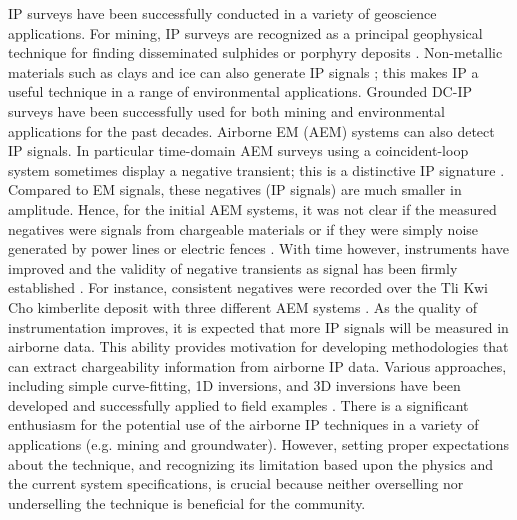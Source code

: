 \documentclass[manuscript]{geophysics}
\begin{document}
IP surveys have been successfully conducted in a variety of geoscience applications. For mining, IP surveys are recognized as a principal geophysical technique for finding disseminated sulphides or porphyry deposits \cite[]{fink1990}. Non-metallic materials such as clays and ice can also generate IP signals \cite[]{grimm2015,leroy2009}; this makes IP a useful technique in a range of environmental applications. Grounded DC-IP surveys have been successfully used for both mining and environmental applications for the past decades.
Airborne EM (AEM) systems can also detect IP signals.
In particular time-domain AEM surveys using a coincident-loop system sometimes display a negative transient; this is a distinctive IP signature \cite[]{weidelt1982}. Compared to EM signals, these negatives (IP signals) are much smaller in amplitude. Hence, for the initial AEM systems, it was not clear if the measured negatives were signals from chargeable materials or if they were simply noise generated by power lines or electric fences \cite[]{smith1996}. With time however, instruments have improved and the validity of negative transients as signal has been firmly established \cite[]{macnae2016,viezzoli2017}. For instance, consistent negatives were recorded over the Tli Kwi Cho kimberlite deposit with three different AEM systems \cite[]{kang2017}. As the quality of instrumentation improves, it is expected that more IP signals will be measured in airborne data. This ability provides motivation for developing methodologies that can extract chargeability information from airborne IP data. Various approaches, including simple curve-fitting, 1D inversions, and 3D inversions have been developed and successfully applied to field examples \cite[]{kratzer2012,kwan2015,hodges2014,kaminski2017,kang2017b}. There is a significant enthusiasm for the potential use of the airborne IP techniques in a variety of applications (e.g. mining and groundwater). However, setting proper expectations about the technique, and recognizing its limitation based upon the physics and the current system specifications, is crucial because neither overselling nor underselling the technique is beneficial for the community.
\end{document}
